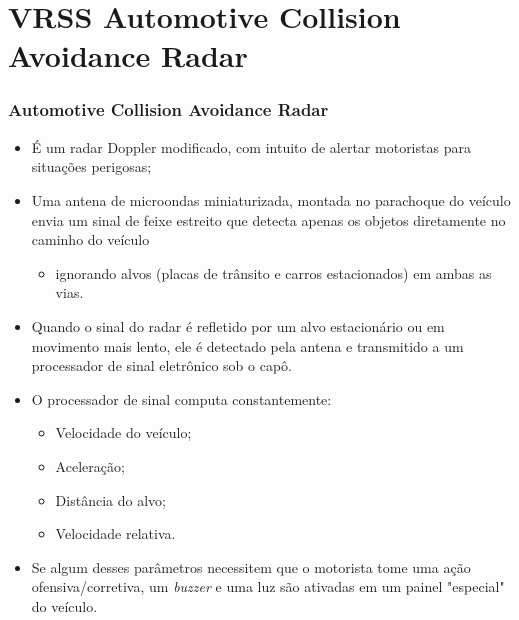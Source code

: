 \documentclass[xcolor=dvipsnames, aspectratio=169]{beamer}
\begin{document}
\section[VRSS Automotive Collision Avoidance Radar]{VRSS Automotive Collision Avoidance Radar} 

\begin{frame}
\frametitle{Automotive Collision Avoidance Radar}
	\begin{itemize}
		\item É um radar Doppler modificado, com intuito de alertar motoristas para situações perigosas;
		\item Uma antena de microondas miniaturizada, montada no parachoque do veículo envia um sinal de feixe estreito que detecta apenas os objetos diretamente no caminho do veículo
        \begin{itemize}
            \item ignorando alvos (placas de trânsito e carros estacionados) em ambas as vias.
        \end{itemize}
        \item Quando o sinal do radar é refletido por um alvo estacionário ou em movimento mais lento, ele é detectado pela antena e transmitido a um processador de sinal eletrônico sob o capô.
        \item O processador de sinal computa constantemente:
        \begin{itemize}
            \item Velocidade do veículo;
            \item Aceleração;
            \item Distância do alvo;
            \item Velocidade relativa.
        \end{itemize}
        \item Se algum desses parâmetros necessitem que o motorista tome uma ação ofensiva/corretiva, um \textit{buzzer} e uma luz são ativadas em um painel "especial" do veículo.
        \begin{figure}
            \centering

\end{figure}
\end{itemize}
\end{frame}
\end{document}
